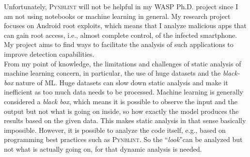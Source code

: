 \documentclass[11pt,a4paper]{article}
\begin{document}
Unfortunately, \textsc{Pynblint} will not be helpful in my WASP Ph.D. project since I am not using notebooks or machine learning in general. My research project focuses on Android root exploits, which means that I analyze malicious apps that can gain root access, i.e., almost complete control, of the infected smartphone. My project aims to find ways to facilitate the analysis of such applications to improve detection capabilities.\\

From my point of knowledge, the limitations and challenges of static analysis of machine learning concern, in particular, the use of huge datasets and the \textit{black-box} nature of ML. Huge datasets can slow down static analysis and make it inefficient as too much data needs to be processed. Machine learning is generally considered a \textit{black box}, which means it is possible to observe the input and the output but not what is going on inside, so how exactly the model produces the results based on the given data. This makes static analysis in that sense basically impossible. However, it is possible to analyze the code itself, e.g., based on programming best practices such as \textsc{Pynblint}. So the \textquotedblleft\textit{look}\textquotedblright can be analyzed but not what is actually going on, for that dynamic analysis is needed.


%
%
\end{document}
